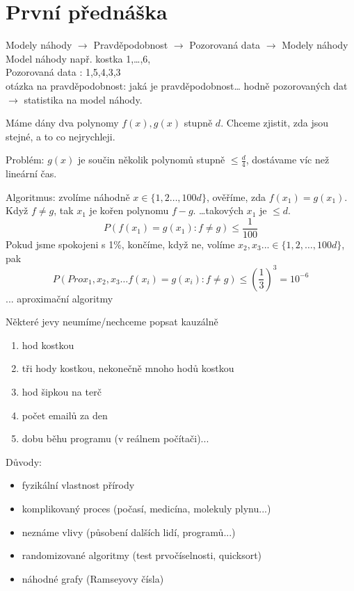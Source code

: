 \documentclass[../main.tex]{subfiles}
\begin{document}
\section{První přednáška}

Modely náhody $\rightarrow$ Pravděpodobnost $\rightarrow$ Pozorovaná data 
$\rightarrow$ Modely náhody\\
Model náhody např. kostka 1,\dots,6,\\
Pozorovaná data : 1,5,4,3,3\\
otázka na pravděpodobnost: jaká je pravděpodobnost\dots
hodně pozorovaných dat $\rightarrow$ statistika na model náhody.

\begin{example}
    Máme dány dva polynomy $f(x),g(x)$ stupně $d$. Chceme zjistit, zda jsou stejné, 
    a to co nejrychleji.

    \noindent
    Problém: $g(x)$ je součin několik polynomů stupně $\leq \frac{d}{4}$, 
    dostávame víc než lineární čas.\\
\end{example}

\begin{solution}
    Algoritmus: zvolíme náhodně $x \in \{1,2\dots,100d\}$, ověříme, 
    zda $f(x_1) = g(x_1)$. Když $f \neq g$, tak $x_1$ je kořen polynomu $f-g$.
    \dots takových $x_1$ je  $\leq d$.\\
    \[P(f(x_1)=g(x_1) : f\neq g) \leq \frac{1}{100}\]
    Pokud jsme spokojeni s 1\%, končíme, když ne, volíme 
    $x_2,x_3... \in \{1,2,\dots,100d\}$, pak 
    \[P(Pro x_1,x_2,x_3\dots  f(x_i)=g(x_i) : f\neq g) \leq 
    \left(\frac{1}{3}\right)^3 = 10^{-6}\]
    ... aproximační algoritmy
\end{solution}

\vspace{5mm}
\noindent 
Některé jevy neumíme/nechceme popsat kauzálně
\begin{enumerate}
    \item hod kostkou
    \item tři hody kostkou, nekonečně mnoho hodů kostkou
    \item hod šipkou na terč
    \item počet emailů za den
    \item dobu běhu programu (v reálnem počítači)...
\end{enumerate}
Důvody:
\begin{itemize}
    \item fyzikální vlastnost přírody
    \item komplikovaný proces (počasí, medicína, molekuly plynu...)
    \item neznáme vlivy (působení dalších lidí, programů...)
    \item randomizované algoritmy (test prvočíselnosti, quicksort)
    \item náhodné grafy (Ramseyovy čísla)
\end{itemize}
\end{document}
